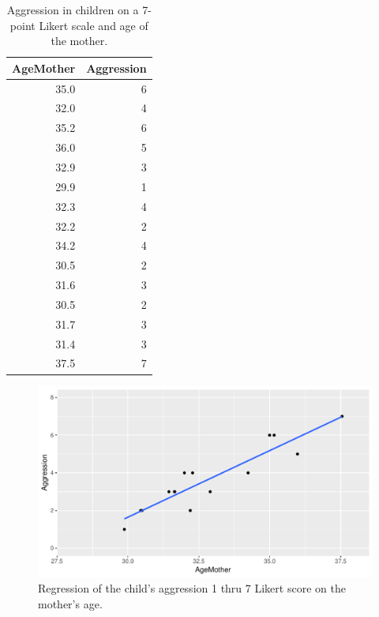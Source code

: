 \documentclass[]{report}\usepackage[]{graphicx}\usepackage[]{color}
\makeatletter
\def\maxwidth{ %
  \ifdim\Gin@nat@width>\linewidth
    \linewidth
  \else
    \Gin@nat@width
  \fi
}
\newenvironment{knitrout}{}{} %
\makeatother
\begin{document}
\begin{table}[ht]
\centering
\caption{Aggression in children on a 7-point Likert scale and age of the mother.} 
\label{tab:nonpar_2}
\begin{tabular}{rr}
  \hline
AgeMother & Aggression \\ 
  \hline
35.0 & 6 \\ 
  32.0 & 4 \\ 
  35.2 & 6 \\ 
  36.0 & 5 \\ 
  32.9 & 3 \\ 
  29.9 & 1 \\ 
  32.3 & 4 \\ 
  32.2 & 2 \\ 
  34.2 & 4 \\ 
  30.5 & 2 \\ 
  31.6 & 3 \\ 
  30.5 & 2 \\ 
  31.7 & 3 \\ 
  31.4 & 3 \\ 
  37.5 & 7 \\ 
   \hline
\end{tabular}
\end{table}



\begin{knitrout}
\color{fgcolor}\begin{figure}

{\centering \includegraphics[width=\maxwidth]{figure/fig1121-1} 

}

\caption[Regression of the child's aggression 1 thru 7 Likert score on the mother's age]{Regression of the child's aggression 1 thru 7 Likert score on the mother's age.}\label{fig:fig1121}
\end{figure}


\end{knitrout}
\end{document}
